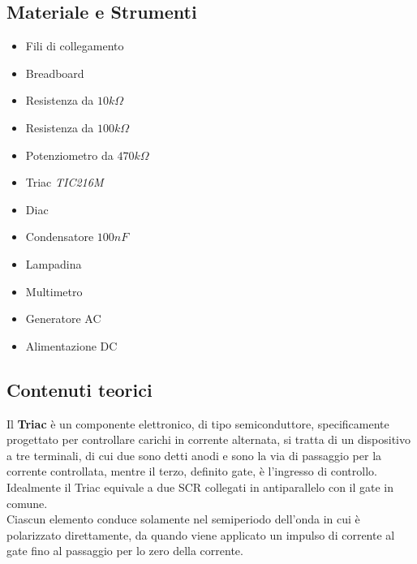 \documentclass[12pt]{article}
\begin{document}
    \subsection{Materiale e Strumenti}
    \begin{multicols}{2}
    \begin{itemize}
    \item Fili di collegamento
    \item Breadboard
    \item Resistenza da $10k\Omega$
    \item Resistenza da $100k\Omega$
    \item Potenziometro da $470k\Omega$
    \item Triac \textit{TIC216M}
    \item Diac
    \item Condensatore $100nF$
    \item Lampadina
    \end{itemize}
    \vfill\null
    \columnbreak
    \begin{itemize}
    \item Multimetro
    \item Generatore AC
    \item Alimentazione DC 
    \end{itemize}
    \vfill\null
    \end{multicols}
    \subsection{Contenuti teorici}
    Il \textbf{Triac} è un componente elettronico, di tipo semiconduttore, specificamente progettato per controllare carichi in corrente alternata, si tratta di un dispositivo a tre terminali, di cui due sono detti anodi e sono la via di passaggio per la corrente controllata, mentre il terzo, definito gate, è l'ingresso di controllo.\\
    Idealmente il Triac equivale a due SCR collegati in antiparallelo con il gate in comune.\\
    Ciascun elemento conduce solamente nel semiperiodo dell'onda in cui è polarizzato direttamente, da quando viene applicato un impulso di corrente al gate fino al passaggio per lo zero della corrente.\\
\end{document}
